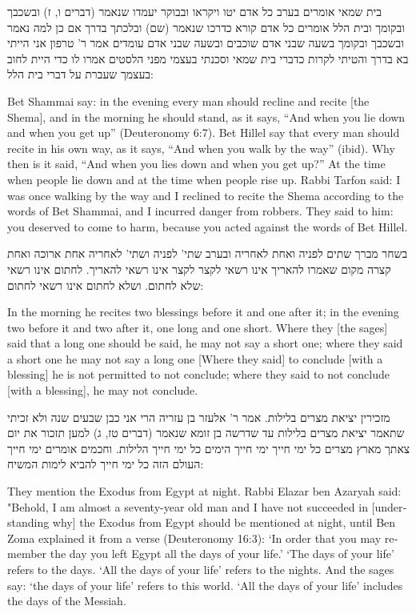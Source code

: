 \documentclass[12pt, openany]{book}
\newcommand{\textblock}[2]{
	{\fontsize{16pt}{20pt}\selectfont #1\\}
	
	\begin{english}
		#2
	\end{english}
	\clearpage
}
\begin{document}
\textblock{בית שמאי אומרים בערב כל אדם יטו ויקראו ובבוקר יעמדו שנאמר (דברים ו, ז) ובשכבך ובקומך ובית הלל אומרים כל אדם קורא כדרכו שנאמר (שם) ובלכתך בדרך אם כן למה נאמר ובשכבך ובקומך בשעה שבני אדם שוכבים ובשעה שבני אדם עומדים אמר ר' טרפון אני הייתי בא בדרך והטיתי לקרות כדברי בית שמאי וסכנתי בעצמי מפני הלסטים אמרו לו כדי היית לחוב בעצמך שעברת על דברי בית הלל: }{Bet Shammai say: in the evening every man should recline and recite {[the Shema]}, and in the morning he should stand, as it says, “And when you lie down and when you get up” (Deuteronomy 6:7). Bet Hillel say that every man should recite in his own way, as it says, “And when you walk by the way” (ibid).  Why then is it said, “And when you lies down and when you get up?” At the time when people lie down and at the time when people rise up. Rabbi Tarfon said: I was once walking by the way and I reclined to recite the Shema according to the words of Bet Shammai, and I incurred danger from robbers. They said to him: you deserved to come to harm, because you acted against the words of Bet Hillel.}
\textblock{בשחר מברך שתים לפניה ואחת לאחריה ובערב שתי' לפניה ושתי' לאחריה אחת ארוכה ואחת קצרה מקום שאמרו להאריך אינו רשאי לקצר לקצר אינו רשאי להאריך. לחתום אינו רשאי שלא לחתום. ושלא לחתום אינו רשאי לחתום: }{In the morning he recites two blessings before it and one after it; in the evening two before it and two after it, one long and one short. Where they {[the sages]} said that a long one should be said, he may not say a short one; where they said a short one he may not say a long one {[Where they said]} to conclude {[with a blessing]} he is not permitted to not conclude; where they said to not conclude {[with a blessing]}, he may not conclude.}
\textblock{מזכירין יציאת מצרים בלילות. אמר ר' אלעזר בן עזריה הרי אני כבן שבעים שנה ולא זכיתי שתאמר יציאת מצרים בלילות עד שדרשה בן זומא שנאמר (דברים טז, ג) למען תזכור את יום צאתך מארץ מצרים כל ימי חייך ימי חייך הימים כל ימי חייך הלילות. וחכמים אומרים ימי חייך העולם הזה כל ימי חייך להביא לימות המשיח: }{They mention the Exodus from Egypt at night. Rabbi Elazar ben Azaryah said: "Behold, I am almost a seventy-year old man and I have not succeeded in {[understanding why]} the Exodus from Egypt should be mentioned at night, until Ben Zoma explained it from a verse (Deuteronomy 16:3): ‘In order that you may remember the day you left Egypt all the days of your life.’ ‘The days of your life’ refers to the days.  ‘All the days of your life’ refers to the nights. And the sages say: ‘the days of your life’ refers to this world.  ‘All the days of your life’ includes the days of the Messiah.}
\end{document}
